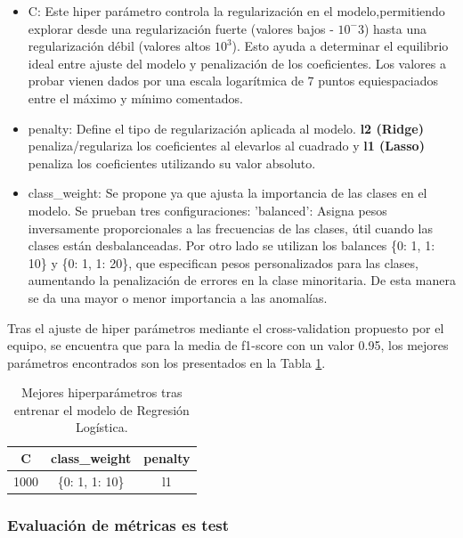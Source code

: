 \documentclass[12pt,letterpaper]{article}
\begin{document}
\begin{itemize}

    \item C: Este hiper parámetro controla la regularización en el modelo,permitiendo explorar desde una regularización fuerte (valores bajos - $10^-3$) hasta una regularización débil (valores altos $10^3$). Esto ayuda a determinar el equilibrio ideal entre ajuste del modelo y penalización de los coeficientes. Los valores a probar vienen dados por una escala logarítmica de 7 puntos equiespaciados entre el máximo y mínimo comentados.
    
    \item penalty: Define el tipo de regularización aplicada al modelo. \textbf{l2 (Ridge)} penaliza/regulariza los coeficientes al elevarlos al cuadrado y \textbf{l1 (Lasso)} penaliza los coeficientes utilizando su valor absoluto.
    
    \item class\_weight: Se propone ya que ajusta la importancia de las clases en el modelo. Se prueban tres configuraciones: 'balanced': Asigna pesos inversamente proporcionales a las frecuencias de las clases, útil cuando las clases están desbalanceadas. Por otro lado se utilizan los balances \{0: 1, 1: 10\} y \{0: 1, 1: 20\}, que especifican pesos personalizados para las clases, aumentando la penalización de errores en la clase minoritaria. De esta manera se da una mayor o menor importancia a las anomalías.
    
\end{itemize}

Tras el ajuste de hiper parámetros mediante el cross-validation propuesto por el equipo, se encuentra que para la media de f1-score con un valor 0.95, los mejores parámetros encontrados son los presentados en la Tabla \ref{tab:hiper-RegresionLogistica}.


\begin{table}[H]
    \centering
    \begin{tabular}{|c|c|c|}
     \hline
     C & class\_weight & penalty \\ \hline
     1000 &  \{0: 1, 1: 10\} & l1 \\ \hline
    \end{tabular}
    \caption{Mejores hiperparámetros tras entrenar el modelo de Regresión Logística.}
    \label{tab:hiper-RegresionLogistica}
\end{table}

\subsubsection{Evaluación de métricas es test}
\end{document}

